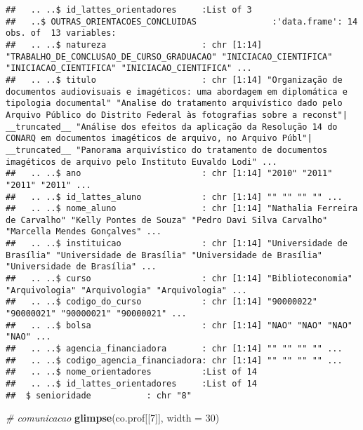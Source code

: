 \documentclass[]{article}
\newenvironment{Shaded}{\begin{snugshade}}{\end{snugshade}}
\newcommand{\KeywordTok}[1]{\textcolor[rgb]{0.13,0.29,0.53}{\textbf{#1}}}
\newcommand{\DataTypeTok}[1]{\textcolor[rgb]{0.13,0.29,0.53}{#1}}
\newcommand{\DecValTok}[1]{\textcolor[rgb]{0.00,0.00,0.81}{#1}}
\newcommand{\CommentTok}[1]{\textcolor[rgb]{0.56,0.35,0.01}{\textit{#1}}}
\newcommand{\NormalTok}[1]{#1}
\begin{document}
\begin{verbatim}
##   .. ..$ id_lattes_orientadores     :List of 3
##   ..$ OUTRAS_ORIENTACOES_CONCLUIDAS               :'data.frame': 14 obs. of  13 variables:
##   .. ..$ natureza                   : chr [1:14] "TRABALHO_DE_CONCLUSAO_DE_CURSO_GRADUACAO" "INICIACAO_CIENTIFICA" "INICIACAO_CIENTIFICA" "INICIACAO_CIENTIFICA" ...
##   .. ..$ titulo                     : chr [1:14] "Organização de documentos audiovisuais e imagéticos: uma abordagem em diplomática e tipologia documental" "Analise do tratamento arquivístico dado pelo Arquivo Público do Distrito Federal às fotografias sobre a reconst"| __truncated__ "Análise dos efeitos da aplicação da Resolução 14 do CONARQ em documentos imagéticos de arquivo, no Arquivo Públ"| __truncated__ "Panorama arquivístico do tratamento de documentos imagéticos de arquivo pelo Instituto Euvaldo Lodi" ...
##   .. ..$ ano                        : chr [1:14] "2010" "2011" "2011" "2011" ...
##   .. ..$ id_lattes_aluno            : chr [1:14] "" "" "" "" ...
##   .. ..$ nome_aluno                 : chr [1:14] "Nathalia Ferreira de Carvalho" "Kelly Pontes de Souza" "Pedro Davi Silva Carvalho" "Marcella Mendes Gonçalves" ...
##   .. ..$ instituicao                : chr [1:14] "Universidade de Brasília" "Universidade de Brasília" "Universidade de Brasília" "Universidade de Brasília" ...
##   .. ..$ curso                      : chr [1:14] "Biblioteconomia" "Arquivologia" "Arquivologia" "Arquivologia" ...
##   .. ..$ codigo_do_curso            : chr [1:14] "90000022" "90000021" "90000021" "90000021" ...
##   .. ..$ bolsa                      : chr [1:14] "NAO" "NAO" "NAO" "NAO" ...
##   .. ..$ agencia_financiadora       : chr [1:14] "" "" "" "" ...
##   .. ..$ codigo_agencia_financiadora: chr [1:14] "" "" "" "" ...
##   .. ..$ nome_orientadores          :List of 14
##   .. ..$ id_lattes_orientadores     :List of 14
##  $ senioridade           : chr "8"
\end{verbatim}

\begin{Shaded}
\begin{Highlighting}[]
\CommentTok{# comunicacao }
\KeywordTok{glimpse}\NormalTok{(co.prof[[}\DecValTok{7}\NormalTok{]], }\DataTypeTok{width =} \DecValTok{30}\NormalTok{)}
\end{Highlighting}
\end{Shaded}
\end{document}
